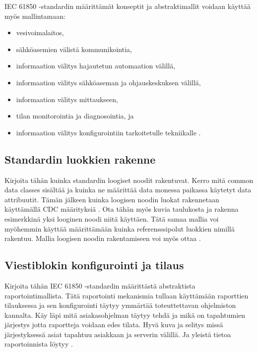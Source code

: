 IEC 61850 -standardin määrittämät konseptit ja abstraktimallit voidaan käyttää myös mallintamaan:
\begin{itemize}
	\item vesivoimalaitos,
	\item sähköasemien välistä kommunikointia,
	\item informaation välitys hajautetun automaation välillä,
	\item informaation välitys sähköaseman ja ohjauskeskuksen välillä,
	\item informaation välitys mittaukseen,
	\item tilan monitorointia ja diagnosointia, ja
	\item informaation välitys konfigurointiin tarkoitetulle tekniikalle \cite[s.~11]{IEC61850-7-1}.
\end{itemize}


\subsection{Standardin luokkien rakenne}
\begin{it}
	Kirjoita tähän kuinka standardin loogiset noodit rakentuvat. Kerro mitä common data classes sisältää ja kuinka ne määrittää data monessa paikassa käytetyt data attribuutit. Tämän jälkeen kuinka loogisen noodin luokat rakennetaan käyttämällä CDC määrityksiä \cite[s.~26]{IEC61850-1}. Ota tähän myös kuvia taulukosta ja rakenna esimerkkinä yksi looginen noodi niitä käyttäen. Tätä samaa mallia voi myöhemmin käyttää määrittämään kuinka referensssipolut luokkien nimillä rakentuu.
	Mallia loogisen noodin rakentamiseen voi myös ottaa \cite[s.~27]{IEC61850-7-1}.
\end{it}


\subsection{Viestiblokin konfigurointi ja tilaus}
\begin{it}
	Kirjoita tähän IEC 61850 -standardin määrittästä abstraktista raportointimallista. Tätä raportointi mekanismia tullaan käyttämään raporttien tilauksessa ja sen konfigurointi täytyy ymmärtää toteuttettavan ohjelmiston kannalta. Käy läpi mitä asiakasohjelman täytyy tehdä ja mikä on tapahtumien järjestys jotta raportteja voidaan edes tilata.
	Hyvä kuva ja selitys missä järjestyksessä asiat tapahtuu asiakkaan ja serverin välillä. Ja yleistä tietoa raportoinnista löytyy \cite[s.~40--44]{IEC61850-7-1}.
\end{it}


